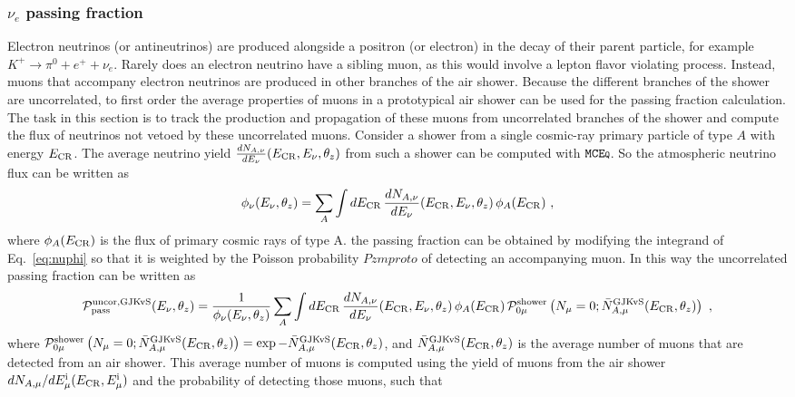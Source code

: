 \subsubsection{$\nu_e$ passing fraction}
Electron neutrinos (or antineutrinos) are produced alongside a positron (or electron) in the decay of their parent particle, for example $K^+ \rightarrow \pi^0 + e^+ + \nu_e$.
Rarely does an electron neutrino have a sibling muon, as this would involve a lepton flavor violating process.
Instead, muons that accompany electron neutrinos are produced in other branches of the air shower.
Because the different branches of the shower are uncorrelated, to first order the average properties of muons in a prototypical air shower can be used for the passing fraction calculation.
The task in this section is to track the production and propagation of these muons from uncorrelated branches of the shower and compute the flux of neutrinos not vetoed by these uncorrelated muons.
Consider a shower from a single cosmic-ray primary particle of type $A$ with energy $E_{\rm CR}$.
The average neutrino yield $\frac{dN_{A, \nu}}{dE_\nu}(E_{\rm CR}, E_\nu, \theta_z)$ from such a shower can be computed with $\texttt{MCE{\scriptsize Q}}$.
So the atmospheric neutrino flux can be written as 
\begin{equation}
\label{eq:nuphi}
\phi_\nu(E_\nu, \theta_z)  = \sum_A \int dE_{\rm CR} \, \frac{dN_{A, \nu}}{dE_\nu}(E_{\rm CR}, E_\nu, \theta_z) \, \phi_A(E_{\rm CR})~,
\end{equation}
where $\phi_A(E_{\rm CR})$ is the flux of primary cosmic rays of type A.
the passing fraction can be obtained by modifying the integrand of Eq.~\ref{eq:nuphi} so that it is weighted by the Poisson probability $Pzmproto$ of detecting an accompanying muon.
In this way the uncorrelated passing fraction can be written as
\begin{equation}
\label{eq:PuncorGJKvS}
{\cal P}_{\rm pass}^{\rm uncor, GJKvS}(E_\nu, \theta_z)  =  \frac{1}{\phi_\nu(E_\nu, \theta_z)} \sum_A \int dE_{\rm CR} \, \frac{dN_{A, \nu}}{dE_\nu}(E_{\rm CR}, E_\nu, \theta_z) \, \phi_A(E_{\rm CR}) \, {\cal P}_{0\mu}^{\rm shower} \left(N_\mu = 0  ; \bar N_{A, \mu}^{\rm GJKvS}(E_{\rm CR}, \theta_z)\right)~,
\end{equation}
where ${\cal P}_{0\mu}^{\rm shower} \left(N_\mu = 0  ; \bar N_{A, \mu}^{\rm GJKvS}(E_{\rm CR}, \theta_z)\right) = \exp{-\bar N_{A, \mu}^{\rm GJKvS}(E_{\rm CR}, \theta_z)}$,
and  $\bar N_{A, \mu}^{\rm GJKvS}(E_{\rm CR}, \theta_z)$ is the average number of muons that are detected from an air shower.
This average number of muons is computed using the yield of muons from the air shower $dN_{A, \mu}/dE_{\mu}^{\rm i}(E_{\rm CR}, E_{\mu}^{\rm i})$ and the probability of detecting those muons, such that
